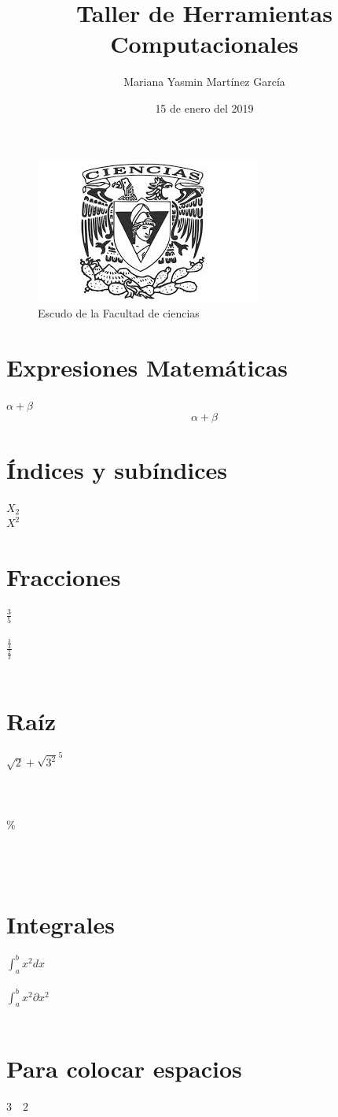 \documentclass{article}
\title{\Huge Taller de Herramientas Computacionales}
\author{Mariana Yasmin Martínez García}
\date{15 de enero del 2019}
\begin{document}
	\maketitle
	\begin{figure}
		\includegraphics[scale=.5]{Imagenes/1}
		\caption{Escudo de la Facultad de ciencias}
		\label{fig:1}
	\end{figure}	
	\newpage
	\section*{Expresiones Matemáticas}
	$ \alpha + \beta $ \\  %
	\[ \alpha + \beta \] %
	\section*{Índices y subíndices}
	$X_{2}$ \\
	$X^{2}$  \\	
	\section*{Fracciones}
	$\frac{3}{5}$\\ \\
	$\frac{\frac{3}{4}}{\frac{2}{3}}$ \\ \\	
	\section*{Raíz}
	$\sqrt{2} + \sqrt{3^2}^5$ \\ \\ \\ \\
	\% \\ \\ \\ \\%
	\section*{Integrales}
	$\int_{a}^{b} x^2 dx$ \\ \\
	$\int_{a}^{b} x^2 \partial x^2$ \\ \\
	\section*{Para colocar espacios}
	$3 \quad 2$
\end{document}
